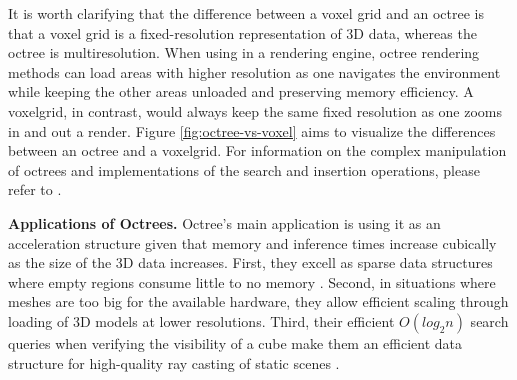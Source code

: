 It is worth clarifying that the difference between a voxel grid and an octree is that a voxel grid is a fixed-resolution representation of 3D data, whereas the octree is multiresolution. When using in a rendering engine, octree rendering methods can load areas with higher resolution as one navigates the environment while keeping the other areas unloaded and preserving memory efficiency. A voxelgrid, in contrast, would always keep the same fixed resolution as one zooms in and out a render. Figure \ref{fig:octree-vs-voxel} aims to visualize the differences between an octree and a voxelgrid. For information on the complex manipulation of octrees and implementations of the search and insertion operations, please refer to \textcite{opengenus2021octree, geeksforgeeks2021octree}.


\textbf{Applications of Octrees.}
Octree's main application is using it as an acceleration structure given that memory and inference times increase cubically as the size of the 3D data increases. 
First, they excell as sparse data structures where empty regions consume little to no memory \cite{laine2010efficient}.
Second, in situations where meshes are too big for the available hardware, they allow efficient scaling through loading of 3D models at lower resolutions. 
Third, their efficient $O(log_{2}n)$ search queries when verifying the visibility of a cube make them an efficient data structure for high-quality ray casting of static scenes \cite{gobbetti2008single}.

